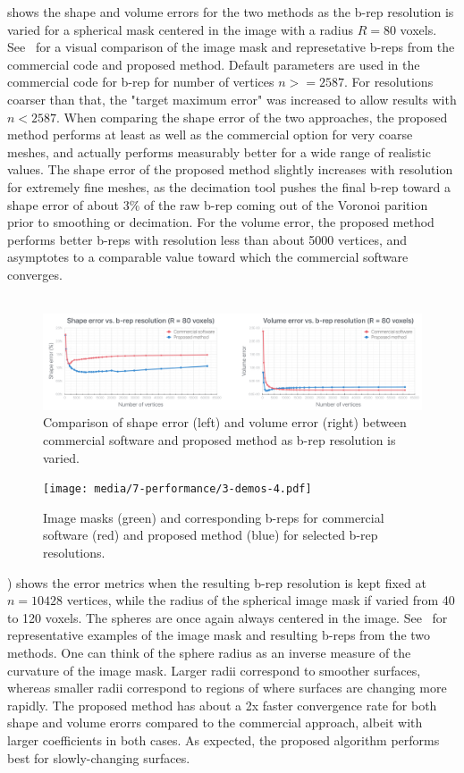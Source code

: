  shows the shape and volume errors for the two methods as the b-rep resolution is varied for a spherical mask centered in the image with a radius $R = 80$ voxels. See~ for a visual comparison of the image mask and represetative b-reps from the commercial code and proposed method. Default parameters are used in the commercial code for b-rep for number of vertices  $n >= 2587$. For resolutions coarser than that, the "target maximum error" was increased to allow results with $n < 2587$. When comparing the shape error of the two approaches, the proposed method performs at least as well as the commercial option for very coarse meshes, and actually performs measurably better for a wide range of realistic values. The shape error of the proposed method slightly increases with resolution for extremely fine meshes, as the decimation tool pushes the final b-rep toward a shape error of about $3\%$ of the raw b-rep coming out of the Voronoi parition prior to smoothing or decimation. For the volume error, the proposed method performs better b-reps with resolution less than about 5000 vertices, and asymptotes to a comparable value toward which the commercial software converges.\\ \\
\begin{figure}[ht!]
	\centering
	\includegraphics[scale=0.25]{media/7-performance/1-graph-1.pdf}
	\caption{Comparison of shape error (left) and volume error (right) between commercial software and proposed method as b-rep resolution is varied.}
	\label{fig:graph1}
\end{figure}
\begin{figure}[ht!]
	\centering
	\texttt{[image: media/7-performance/3-demos-4.pdf]}
	\caption{Image masks (green) and corresponding b-reps for commercial software (red) and proposed method (blue) for selected b-rep resolutions.}
	\label{fig:demos1}
\end{figure}
%
) shows the error metrics when the resulting b-rep resolution is kept fixed at $n = 10428$ vertices, while the radius of the spherical image mask if varied from 40 to 120 voxels. The spheres are once again always centered in the image. See~ for representative examples of the image mask and resulting b-reps from the two methods. One can think of the sphere radius as an inverse measure of the curvature of the image mask. Larger radii correspond to smoother surfaces, whereas smaller radii correspond to regions of where surfaces are changing more rapidly. The proposed method has about a 2x faster convergence rate for both shape and volume erorrs compared to the commercial approach, albeit with larger coefficients in both cases. As expected, the proposed algorithm performs best for slowly-changing surfaces.
